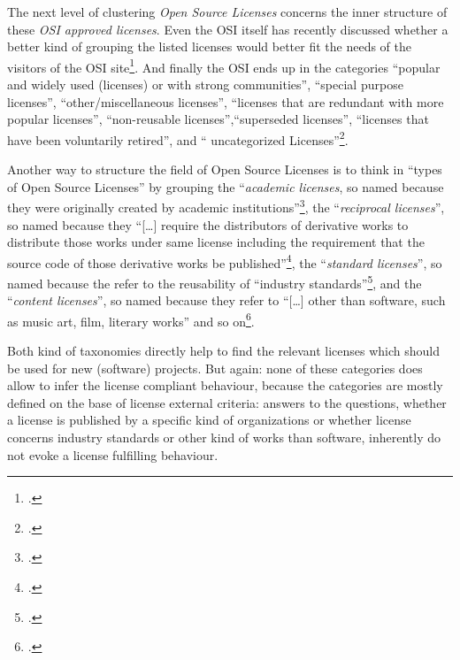 The next level of clustering \emph{Open Source Licenses} concerns the inner
structure of these \emph{OSI approved licenses}. Even the OSI itself has recently
discussed whether a better kind of grouping the listed licenses would better fit
the needs of the visitors of the OSI site\footcite[cf.][\nopage wp]{OSI2013a}.
And finally the OSI ends up in the categories \enquote{popular and widely used
(licenses) or with strong communities}, \enquote{special purpose licenses},
\enquote{other/miscellaneous licenses}, \enquote{licenses that are redundant
with more popular licenses}, \enquote{non-reusable licenses},\enquote{superseded
licenses}, \enquote{licenses that have been voluntarily retired}, and \enquote{
uncategorized Licenses}\footcite[cf.][\nopage wp]{OSI2013b}.

Another way to structure the field of Open Source Licenses is to think in
\enquote{types of Open Source Licenses} by grouping the \enquote{\emph{academic
licenses}, so named because they were originally created by academic
institutions}\footcite[cf.][69]{Rosen2005a}, the \enquote{\emph{reciprocal
licenses}}, so named because they \enquote{[\ldots] require the distributors of
derivative works to dis\-tri\-bu\-te those works under same license including the
requirement that the source code of those derivative works be
published}\footcite[cf.][70]{Rosen2005a}, the \enquote{\emph{standard
licenses}}, so named because the refer to the reusability of \enquote{industry
standards}\footcite[cf.][70]{Rosen2005a}, and the \enquote{\emph{content
licenses}}, so named because they refer to
\enquote{[\ldots] other than software, such as music art, film, literary works}
and so on\footcite[cf.][71]{Rosen2005a}.

Both kind of taxonomies directly help to find the relevant licenses which should
be used for new (software) projects. But again: none of these categories does
allow to infer the license compliant behaviour, because the categories are
mostly defined on the base of license external criteria: answers to the
questions, whether a license is published by a specific kind of organizations or
whether license concerns industry standards or other kind of works than
software, inherently do not evoke a license fulfilling behaviour.

